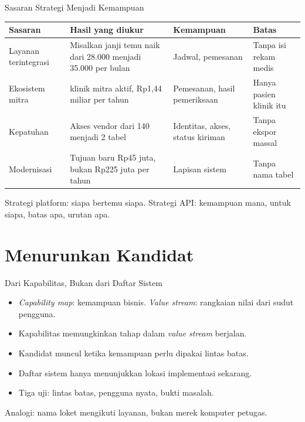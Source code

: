 \documentclass[aspectratio=169, table, 12pt]{beamer}
\begin{document}
\begin{frame}{{\Large Sasaran Strategi Menjadi Kemampuan}}
  \footnotesize
  \begin{tabularx}{\textwidth}{>{\raggedright\arraybackslash}p{2.7cm}
      >{\raggedright\arraybackslash}X >{\raggedright\arraybackslash}p{2.8cm} >{\raggedright\arraybackslash}p{2.9cm}}
    \hline
    \textbf{Sasaran} & \textbf{Hasil yang diukur} & \textbf{Kemampuan} & \textbf{Batas} \\ \hline
    Layanan terintegrasi & Misalkan janji temu naik dari 28.000 menjadi 35.000 per bulan & Jadwal, pemesanan & Tanpa isi rekam medis \\ \hline
    Ekosistem mitra & 40 klinik mitra aktif, Rp1,44 miliar per tahun & Pemesanan, hasil pemeriksaan & Hanya pasien klinik itu \\ \hline
    Kepatuhan & Akses vendor dari 140 menjadi 2 tabel & Identitas, akses, status kiriman & Tanpa ekspor massal \\ \hline
    Modernisasi & Tujuan baru Rp45 juta, bukan Rp225 juta per tahun & Lapisan sistem & Tanpa nama tabel \\ \hline
  \end{tabularx}

  \vspace{8pt}
  \small Strategi platform: siapa bertemu siapa. Strategi API: kemampuan mana, untuk siapa, batas apa, urutan apa.
\end{frame}

\section{Menurunkan Kandidat}

\begin{frame}{{\Large Dari Kapabilitas, Bukan dari Daftar Sistem}}
  \vspace{8pt}
  \begin{itemize}
    \item \textit{Capability map}: kemampuan bisnis. \textit{Value stream}: rangkaian nilai dari sudut pengguna.
    \item Kapabilitas memungkinkan tahap dalam \textit{value stream} berjalan.
    \item Kandidat muncul ketika kemampuan perlu dipakai lintas batas.
    \item Daftar sistem hanya menunjukkan lokasi implementasi sekarang.
    \item Tiga uji: lintas batas, pengguna nyata, bukti masalah.
  \end{itemize}
  \vspace{6pt}
  {\small Analogi: nama loket mengikuti layanan, bukan merek komputer petugas.}
\end{frame}
\end{document}
